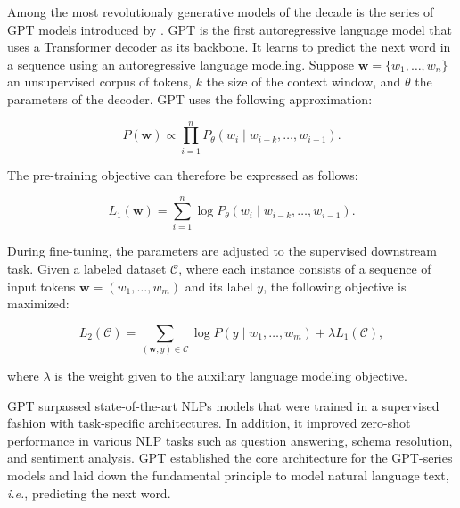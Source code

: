 Among the most revolutionaly generative models of the decade is the series of \ac{GPT} models introduced by \citep{radford2018improving}. \ac{GPT} is the first autoregressive language model that uses a Transformer decoder as its backbone. It learns to predict the next word in a sequence using an autoregressive language modeling. Suppose $\bm{w} = \{w_1, \ldots, w_n\}$ an unsupervised corpus of tokens, $k$ the size of the context window, and $\theta$ the parameters of the decoder. 
\ac{GPT} uses the following approximation:

\begin{equation}
    P(\bm{w}) \propto \prod_{i=1}^n P_{\theta}(w_i \mid w_{i-k}, \ldots, w_{i-1}).
\end{equation}

\noindent The pre-training objective can therefore be expressed as follows:

\begin{equation}
    L_1(\bm{w}) = \sum_{i=1}^n \log P_{\theta}(w_i \mid w_{i-k}, \ldots, w_{i-1}).
\end{equation}

\noindent During fine-tuning, the parameters are adjusted to the supervised downstream task. Given a labeled dataset $\mathcal{C}$, where each instance consists of a sequence of input tokens $\bm{w} = (w_1, \ldots, w_m)$ and its label $y$, the following objective is maximized:

\begin{equation}
    L_2(\mathcal{C}) = \sum_{(\bm{w}, y) \in \mathcal{C}} \log P(y \mid w_1, \ldots, w_m) + \lambda L_1(\mathcal{C}),
\end{equation}

\noindent where $\lambda$ is the weight given to the auxiliary language modeling objective.

\noindent \ac{GPT} surpassed state-of-the-art \acp{NLP} models that were trained in a supervised fashion with task-specific architectures. In addition, it improved zero-shot performance in various \ac{NLP} tasks such as question answering, schema resolution, and sentiment analysis. \ac{GPT} established the core architecture for the \ac{GPT}-series models and laid down the fundamental principle to model natural language text, \textit{i.e.}, predicting the next word.

